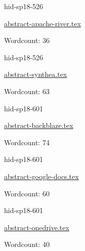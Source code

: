 

\begin{IU}

hid-sp18-526

\href{https://github.com/cloudmesh-community/hid-sp18-526/blob/master//technology/abstract-apache-river.tex}{abstract-apache-river.tex}

 

Wordcount: 36

\end{IU}



\begin{IU}

hid-sp18-526

\href{https://github.com/cloudmesh-community/hid-sp18-526/blob/master//technology/abstract-synthea.tex}{abstract-synthea.tex}

 

Wordcount: 63

\end{IU}



\begin{IU}

hid-sp18-601

\href{https://github.com/cloudmesh-community/hid-sp18-601/blob/master//technology/abstract-backblaze.tex}{abstract-backblaze.tex}

 

Wordcount: 74

\end{IU}



\begin{IU}

hid-sp18-601

\href{https://github.com/cloudmesh-community/hid-sp18-601/blob/master//technology/abstract-google-docs.tex}{abstract-google-docs.tex}

 

Wordcount: 60

\end{IU}



\begin{IU}

hid-sp18-601

\href{https://github.com/cloudmesh-community/hid-sp18-601/blob/master//technology/abstract-onedrive.tex}{abstract-onedrive.tex}

 

Wordcount: 40

\end{IU}


